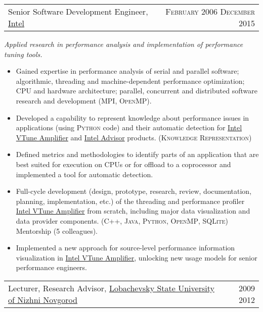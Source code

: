 \documentclass{article}
\makeatletter
\newcommand{\whatwherewhen}[3]{
\noindent\begin{tabular*}{\columnwidth}{@{}@{\extracolsep{\fill}}lr@{}}
#1, #2 & \textsc{#3}
\end{tabular*}}
\newcommand{\smallvskip}{\vskip2mm}
\makeatother
\begin{document}
\smallvskip
\whatwherewhen{Senior Software Development Engineer}{\href{https://intel.com}{Intel}}{February 2006 \textendash{} December 2015}

\textit{Applied research in performance analysis and implementation of performance tuning tools.}

\begin{itemize}

\item Gained expertise in performance analysis of serial and parallel software; algorithmic, threading and machine-dependent performance optimization; CPU and hardware architecture; parallel, concurrent and distributed software research and development (\textsc{MPI}, \textsc{OpenMP}).

\item Developed a capability to represent knowledge about performance issues in applications (using \textsc{Python} code) and their automatic detection for \href{http://software.intel.com/en-us/intel-vtune-amplifier-xe}{Intel VTune Amplifier} and \href{https://software.intel.com/en-us/intel-advisor-xe}{Intel Advisor} products. (\textsc{Knowledge Representation})

\item Defined metrics and methodologies to identify parts of an application that are best suited for execution on CPUs or for offload to a coprocessor and implemented a tool for automatic detection.

\item Full-cycle development (design, prototype, research, review, documentation, planning, implementation, etc.) of the threading and performance profiler \href{http://software.intel.com/en-us/intel-vtune-amplifier-xe}{Intel VTune Amplifier} from scratch, including major data visualization and data provider components. (\textsc{C++}, \textsc{Java}, \textsc{Python}, \textsc{OpenMP}, \textsc{SQLite}) Mentorship (5 colleagues).

\item Implemented a new approach for source-level performance information visualization in \href{http://software.intel.com/en-us/intel-vtune-amplifier-xe}{Intel VTune Amplifier}, unlocking new usage models for senior performance engineers.

\end{itemize}


\smallvskip
\whatwherewhen{Lecturer, Research Advisor}{\href{http://unn.ru/eng}{Lobachevsky State University of Nizhni Novgorod}}{2009 \textendash{} 2012}
\end{document}
